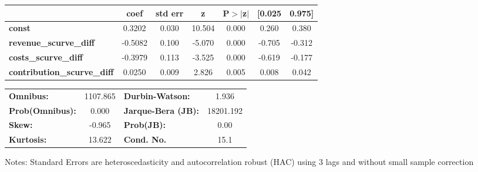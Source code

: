 \begin{center}
\begin{tabular}{lcccccc}
                                    & \textbf{coef} & \textbf{std err} & \textbf{z} & \textbf{P$> |$z$|$} & \textbf{[0.025} & \textbf{0.975]}  \\
\midrule
\textbf{const}                      &       0.3202  &        0.030     &    10.504  &         0.000        &        0.260    &        0.380     \\
\textbf{revenue\_scurve\_diff}      &      -0.5082  &        0.100     &    -5.070  &         0.000        &       -0.705    &       -0.312     \\
\textbf{costs\_scurve\_diff}        &      -0.3979  &        0.113     &    -3.525  &         0.000        &       -0.619    &       -0.177     \\
\textbf{contribution\_scurve\_diff} &       0.0250  &        0.009     &     2.826  &         0.005        &        0.008    &        0.042     \\
\bottomrule
\end{tabular}
\begin{tabular}{lclc}
\textbf{Omnibus:}       & 1107.865 & \textbf{  Durbin-Watson:     } &     1.936  \\
\textbf{Prob(Omnibus):} &   0.000  & \textbf{  Jarque-Bera (JB):  } & 18201.192  \\
\textbf{Skew:}          &  -0.965  & \textbf{  Prob(JB):          } &      0.00  \\
\textbf{Kurtosis:}      &  13.622  & \textbf{  Cond. No.          } &      15.1  \\
\bottomrule
\end{tabular}
\end{center}

Notes: \newline
 [1] Standard Errors are heteroscedasticity and autocorrelation robust (HAC) using 3 lags and without small sample correction